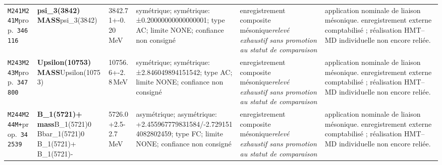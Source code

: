 \begin{landscape}
\begin{longtable}{L{1.85cm}L{4.45cm}L{2.35cm}L{4.05cm}L{3.35cm}L{7.15cm}}
\texttt{M241}\newline \texttt{M241M}\newline prop.\ \texttt{346116} & \textbf{psi\_\allowbreak{}3(3842) MASS}\newline psi\_\allowbreak{}3(3842) & 3842.71+-0.20\,MeV & symétrique; symétrique: ±0.20000000000000001; type AC; limite NONE; confiance non consigné & enregistrement composite mésonique\newline \emph{relevé exhaustif sans promotion au statut de comparaison} & application nominale de liaison mésonique. enregistrement externe comptabilisé ; réalisation HMT--MD individuelle non encore reliée. \\
\texttt{M243}\newline \texttt{M243M}\newline prop.\ \texttt{347800} & \textbf{Upsilon(10753) MASS}\newline Upsilon(10753) & 10756.6+-2.8\,MeV & symétrique; symétrique: ±2.846049894151542; type AC; limite NONE; confiance non consigné & enregistrement composite mésonique\newline \emph{relevé exhaustif sans promotion au statut de comparaison} & application nominale de liaison mésonique. enregistrement externe comptabilisé ; réalisation HMT--MD individuelle non encore reliée. \\
\texttt{M244}\newline \texttt{M244M+}\newline prop.\ \texttt{342539} & \textbf{B\_\allowbreak{}1(5721)+ mass}\newline B\_\allowbreak{}1(5721)0 \textbar{}\allowbreak{} Bbar\_\allowbreak{}1(5721)0 \textbar{}\allowbreak{} B\_\allowbreak{}1(5721)+ \textbar{}\allowbreak{} B\_\allowbreak{}1(5721)- & 5726.0+2.5-2.7\,MeV & asymétrique; asymétrique: +2.455967779831584/-2.7291514082802459; type FC; limite NONE; confiance non consigné & enregistrement composite mésonique\newline \emph{relevé exhaustif sans promotion au statut de comparaison} & application nominale de liaison mésonique. enregistrement externe comptabilisé ; réalisation HMT--MD individuelle non encore reliée. \\

\end{longtable}
\end{landscape}
